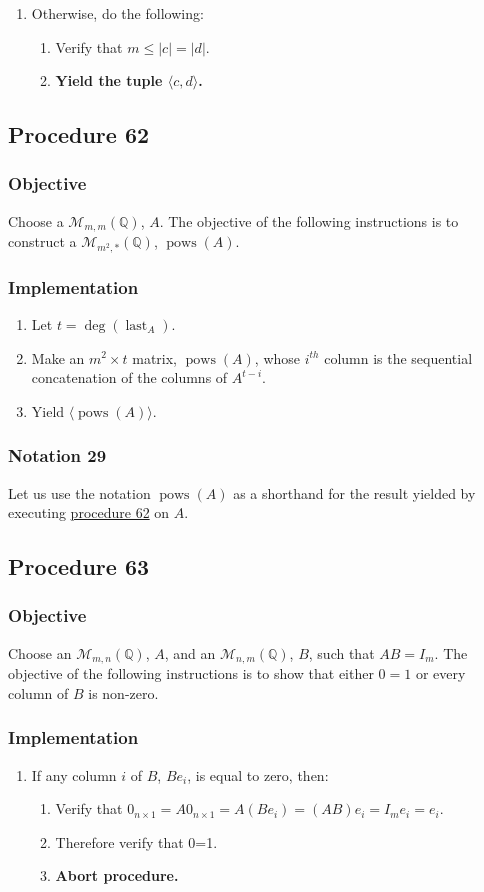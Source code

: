\documentclass[twocolumn]{article}
\DeclareMathOperator{\pows}{pows}
\DeclareMathOperator{\last}{last}
\newcommand{\notation}[1]{\subsubsection*{Notation #1}}
\newcommand{\procedure}[2][]{\subsection*{Procedure #2 \ifthenelse{\equal{#1}{}}{}{(#1)}}\label{sec:procedure #2}}
\newcommand{\objective}{\subsubsection*{Objective}}
\newcommand{\implementation}{\subsubsection*{Implementation}}
\begin{document}
\begin{enumerate}
\begin{enumerate}
						\item Verify that each change of $J_m(x)$ over the course of (12) was by $1$.
						\item Verify that $J_m(x)$ changed less than $m$ times over the course of (12).
						\item Therefore verify that $\lvert J_m(U)-J_m(-U)\rvert<m$.
						\item Therefore using (2) and (3), verify that $m=\lvert J_m(U)-J_m(-U)\rvert<m$.
						\item \textbf{Abort procedure.}
					\end{enumerate}
					\item Otherwise, do the following:
					\begin{enumerate}
						\item Verify that $m\le\lvert c\rvert=\lvert d\rvert$.
						\item \textbf{Yield the tuple $\langle c,d\rangle$.}
					\end{enumerate}
				\end{enumerate}
		\procedure{62}
			\objective
				Choose a $\mathcal{M}_{m,m}(\mathbb{Q})$, $A$. The objective of the following instructions is to construct a $\mathcal{M}_{m^2,*}(\mathbb{Q})$, $\pows(A)$.
			\implementation
				\begin{enumerate}
					\item Let $t=\deg(\last_A)$.
					\item Make an $m^2\times t$ matrix, $\pows(A)$, whose $i^{th}$ column is the sequential concatenation of the columns of $A^{t-i}$.
					\item Yield $\langle\pows(A)\rangle$.
				\end{enumerate}
		\notation{29}
			Let us use the notation $\pows(A)$ as a shorthand for the result yielded by executing \hyperref[sec:procedure 62]{procedure 62} on $A$.
		\procedure{63}
			\objective
				Choose an $\mathcal{M}_{m,n}(\mathbb{Q})$, $A$, and an $\mathcal{M}_{n,m}(\mathbb{Q})$, $B$, such that $AB=I_m$. The objective of the following instructions is to show that either $0=1$ or every column of $B$ is non-zero.
			\implementation
				\begin{enumerate}
					\item If any column $i$ of $B$, $Be_i$, is equal to zero, then:
					\begin{enumerate}
						\item Verify that $0_{n\times 1}=A0_{n\times 1}=A(Be_i)=(AB)e_i=I_me_i=e_i$.
						\item Therefore verify that 0=1.
						\item \textbf{Abort procedure.}
					\end{enumerate}
				\end{enumerate}
\end{document}
